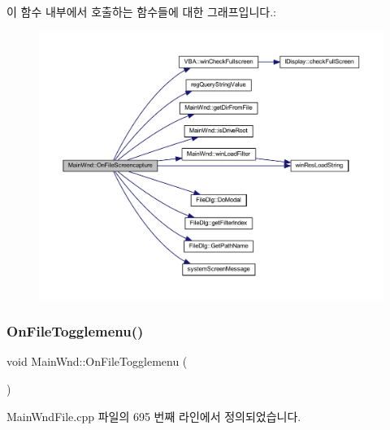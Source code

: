 이 함수 내부에서 호출하는 함수들에 대한 그래프입니다.\+:
\nopagebreak
\begin{figure}[H]
\begin{center}
\leavevmode
\includegraphics[width=350pt]{class_main_wnd_a869b47c3aae70c534109b9a8310e1faf_cgraph}
\end{center}
\end{figure}
\mbox{\label{class_main_wnd_ad376d27bd5299961827dda9d8700a375}} 
\subsubsection{\texorpdfstring{On\+File\+Togglemenu()}{OnFileTogglemenu()}}
{\footnotesize\ttfamily void Main\+Wnd\+::\+On\+File\+Togglemenu (\begin{DoxyParamCaption}{ }\end{DoxyParamCaption})\hspace{0.3cm}{\ttfamily [protected]}}



Main\+Wnd\+File.\+cpp 파일의 695 번째 라인에서 정의되었습니다.


